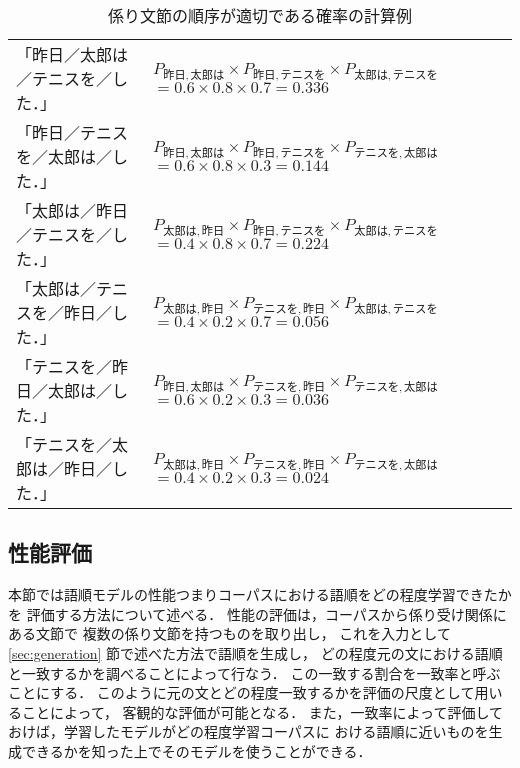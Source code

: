   \begin{table*}[htbp]
    \begin{center}
      \caption{係り文節の順序が適切である確率の計算例}
      \label{table:example}
      \leavevmode
      \renewcommand{\arraystretch}{}
      \begin{tabular}[c]{|l|p{6.5cm}|}
        \hline
        「昨日／太郎は／テニスを／した．」 
        & $P_{ 昨日,太郎は} 
        \times P_{昨日,テニスを} 
        \times P_{太郎は,テニスを}$
        $= 0.6 \times 0.8 \times 0.7 = 0.336$\\
        「昨日／テニスを／太郎は／した．」
        & $P_{ 昨日,太郎は} 
        \times P_{昨日,テニスを} 
        \times P_{テニスを,太郎は}$
        $= 0.6 \times 0.8 \times 0.3 = 0.144$\\
        「太郎は／昨日／テニスを／した．」
        & $P_{ 太郎は,昨日} 
        \times P_{昨日,テニスを} 
        \times P_{太郎は,テニスを}$
        $= 0.4 \times 0.8 \times 0.7 = 0.224$\\
        「太郎は／テニスを／昨日／した．」
        & $P_{ 太郎は,昨日} 
        \times P_{テニスを,昨日} 
        \times P_{太郎は,テニスを}$
        $= 0.4 \times 0.2 \times 0.7 = 0.056$\\
        「テニスを／昨日／太郎は／した．」
        & $P_{ 昨日,太郎は} 
        \times P_{テニスを,昨日} 
        \times P_{テニスを,太郎は}$
        $= 0.6 \times 0.2 \times 0.3 = 0.036$\\
        「テニスを／太郎は／昨日／した．」
        & $P_{ 太郎は,昨日} 
        \times P_{テニスを,昨日} 
        \times P_{テニスを,太郎は}$
        $= 0.4 \times 0.2 \times 0.3 = 0.024$\\
        \hline
      \end{tabular}
    \end{center}
  \end{table*}

\subsection{性能評価}
\label{sec:evaluation}

本節では語順モデルの性能つまりコーパスにおける語順をどの程度学習できたかを
評価する方法について述べる．
性能の評価は，コーパスから係り受け関係にある文節で
複数の係り文節を持つものを取り出し，
これを入力として\ref{sec:generation} 節で述べた方法で語順を生成し，
どの程度元の文における語順と一致するかを調べることによって行なう．
この一致する割合を一致率と呼ぶことにする．
このように元の文とどの程度一致するかを評価の尺度として用いることによって，
客観的な評価が可能となる．
また，一致率によって評価しておけば，学習したモデルがどの程度学習コーパスに
おける語順に近いものを生成できるかを知った上でそのモデルを使うことができる．

